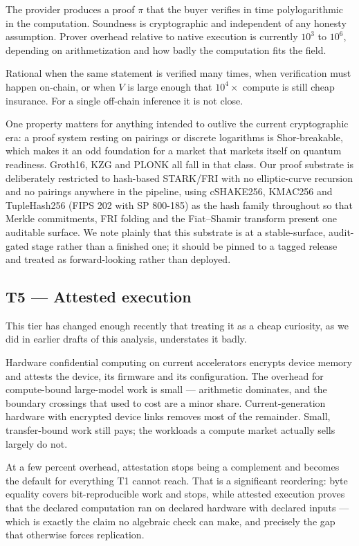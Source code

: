 \documentclass[11pt,a4paper]{article}
\begin{document}
The provider produces a proof $\pi$ that the buyer verifies in time polylogarithmic
in the computation. Soundness is cryptographic and independent of any honesty
assumption. Prover overhead relative to native execution is currently $10^{3}$
to $10^{6}$, depending on arithmetization and how badly the computation fits the
field.

Rational when the same statement is verified many times, when verification must
happen on-chain, or when $V$ is large enough that $10^{4} \times$ compute is
still cheap insurance. For a single off-chain inference it is not close.

One property matters for anything intended to outlive the current cryptographic
era: a proof system resting on pairings or discrete logarithms is Shor-breakable,
which makes it an odd foundation for a market that markets itself on quantum
readiness. Groth16, KZG and PLONK all fall in that class. Our proof substrate is
deliberately restricted to hash-based STARK/FRI with no elliptic-curve recursion
and no pairings anywhere in the pipeline, using cSHAKE256, KMAC256 and
TupleHash256 (FIPS 202 with SP 800-185) as the hash family throughout so that
Merkle commitments, FRI folding and the Fiat--Shamir transform present one
auditable surface. We note plainly that this substrate is at a stable-surface,
audit-gated stage rather than a finished one; it should be pinned to a tagged
release and treated as forward-looking rather than deployed.

\subsection{T5 --- Attested execution}

This tier has changed enough recently that treating it as a cheap curiosity, as
we did in earlier drafts of this analysis, understates it badly.

Hardware confidential computing on current accelerators encrypts device memory
and attests the device, its firmware and its configuration. The overhead for
compute-bound large-model work is small --- arithmetic dominates, and the
boundary crossings that used to cost are a minor share. Current-generation
hardware with encrypted device links removes most of the remainder. Small,
transfer-bound work still pays; the workloads a compute market actually sells
largely do not.

At a few percent overhead, attestation stops being a complement and becomes the
default for everything T1 cannot reach. That is a significant reordering: byte
equality covers bit-reproducible work and stops, while attested execution proves
that the declared computation ran on declared hardware with declared inputs ---
which is exactly the claim no algebraic check can make, and precisely the gap
that otherwise forces replication.
\end{document}
